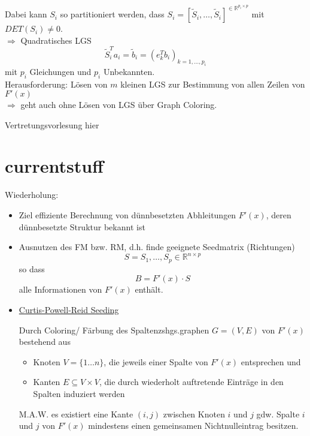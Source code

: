 Dabei kann $S_i$ so partitioniert werden, dass $S_i = [\tilde{S}_i,\dots,\tilde{S}_i]^{\in \mathbb{R}^{p_i\times p}}$ mit $DET(S_i) \neq 0$.\\
$\Rightarrow$ Quadratisches LGS
$$\tilde{S}_i^Ta_i = \tilde{b}_i=\left(e_k^Tb_i\right)_{k=1,\dots,p_i}$$
mit $p_i$ Gleichungen und $p_i$ Unbekannten.\\

\noindent
Herausforderung: Lösen von $m$ kleinen LGS zur Bestimmung von allen Zeilen von $F'(x)$\\

\noindent
$\Rightarrow$ geht auch ohne Lösen von LGS über Graph Coloring.

\noindent\makebox[\linewidth]{\rule{\paperwidth}{0.4pt}}
Vertretungsvorlesung hier\\
\noindent\makebox[\linewidth]{\rule{\paperwidth}{0.4pt}}

%

\section{currentstuff}

Wiederholung:
\begin{itemize}
	\item Ziel effiziente Berechnung von dünnbesetzten Abhleitungen $F'(x)$, deren dünnbesetzte Struktur bekannt ist
	\item  Ausnutzen des FM bzw. RM, d.h. finde geeignete Seedmatrix (Richtungen)
	$$S = S_1, \dots , S_p \in \mathbb{R}^{n\times p}$$
	so dass
	$$B=F'(x) \cdot S$$
	alle Informationen von $F'(x)$ enthält.
	\item \underline{Curtis-Powell-Reid Seeding}
	
	Durch Coloring/ Färbung des Spaltenzshgs.graphen $G=(V,E)$ von $F'(x)$ bestehend aus
	\begin{itemize}
		\item Knoten $V=\{1\dots n\}$, die jeweils einer Spalte von $F'(x)$ entsprechen und 
		\item Kanten $E\subseteq V\times V$, die durch wiederholt auftretende Einträge in den Spalten induziert werden
	\end{itemize}
	M.A.W. es existiert eine Kante $(i,j)$ zwischen Knoten $i$ und $j$ gdw. Spalte $i$ und $j$ von $F'(x)$ mindestens einen gemeinsamen Nichtnulleintrag besitzen.\\
\end{itemize}

